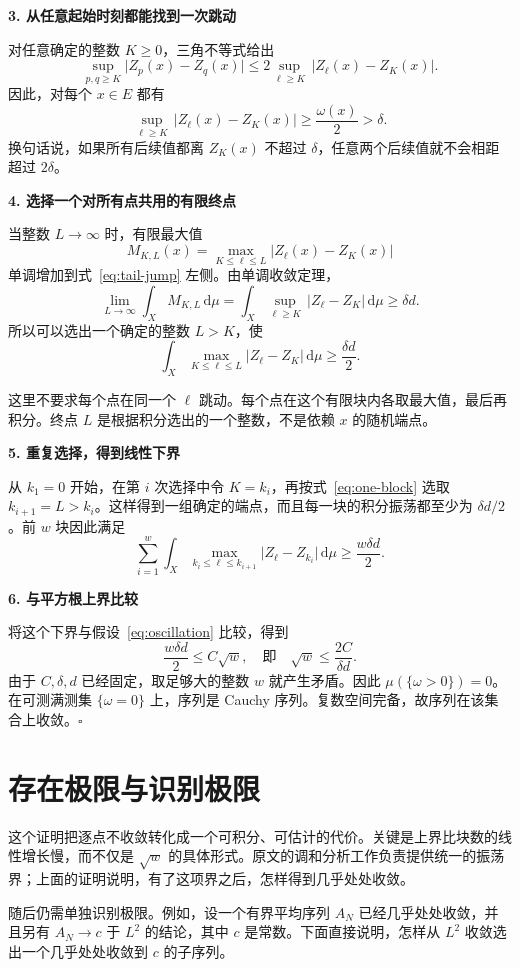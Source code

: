 \documentclass[12pt,a4paper]{article}
\newcommand{\step}[1]{\par\addvspace{0.65em}\Needspace{5\baselineskip}\noindent\textbf{#1}\par\nobreak}
\newcommand{\dd}{\,\mathrm{d}}
\begin{document}
\step{3. 从任意起始时刻都能找到一次跳动}
对任意确定的整数 $K\geq0$，三角不等式给出
\[
\sup_{p,q\geq K}\lvert Z_p(x)-Z_q(x)\rvert
\leq 2\sup_{\ell\geq K}\,\lvert Z_\ell(x)-Z_K(x)\rvert.
\]
因此，对每个 $x\in E$ 都有
\begin{equation}\label{eq:tail-jump}
\sup_{\ell\geq K}\,\lvert Z_\ell(x)-Z_K(x)\rvert
\geq\frac{\omega(x)}2>\delta.
\end{equation}
换句话说，如果所有后续值都离 $Z_K(x)$ 不超过 $\delta$，任意两个后续值就不会相距超过 $2\delta$。

\step{4. 选择一个对所有点共用的有限终点}
当整数 $L\to\infty$ 时，有限最大值
\[
M_{K,L}(x)=\max_{K\leq\ell\leq L}\lvert Z_\ell(x)-Z_K(x)\rvert
\]
单调增加到式~\eqref{eq:tail-jump} 左侧。由单调收敛定理，
\[
\lim_{L\to\infty}\int_X M_{K,L}\dd\mu
=\int_X\sup_{\ell\geq K}\,\lvert Z_\ell-Z_K\rvert\dd\mu
\geq\delta d.
\]
所以可以选出一个确定的整数 $L>K$，使
\begin{equation}\label{eq:one-block}
\int_X\max_{K\leq\ell\leq L}\lvert Z_\ell-Z_K\rvert\dd\mu
\geq\frac{\delta d}{2}.
\end{equation}

这里不要求每个点在同一个 $\ell$ 跳动。每个点在这个有限块内各取最大值，最后再积分。终点 $L$ 是根据积分选出的一个整数，不是依赖 $x$ 的随机端点。

\step{5. 重复选择，得到线性下界}
从 $k_1=0$ 开始，在第 $i$ 次选择中令 $K=k_i$，再按式~\eqref{eq:one-block} 选取 $k_{i+1}=L>k_i$。这样得到一组确定的端点，而且每一块的积分振荡都至少为 $\delta d/2$。前 $w$ 块因此满足
\[
\sum_{i=1}^{w}\int_X
\max_{k_i\leq\ell\leq k_{i+1}}
\lvert Z_\ell-Z_{k_i}\rvert\dd\mu
\geq\frac{w\delta d}{2}.
\]

\step{6. 与平方根上界比较}
将这个下界与假设~\eqref{eq:oscillation} 比较，得到
\[
\frac{w\delta d}{2}\leq C\sqrt w,
\quad\text{即}\quad
\sqrt w\leq\frac{2C}{\delta d}.
\]
由于 $C,\delta,d$ 已经固定，取足够大的整数 $w$ 就产生矛盾。因此 $\mu(\{\omega>0\})=0$。在可测满测集 $\{\omega=0\}$ 上，序列是 Cauchy 序列。复数空间完备，故序列在该集合上收敛。\hfill$\square$

\section{存在极限与识别极限}
这个证明把逐点不收敛转化成一个可积分、可估计的代价。关键是上界比块数的线性增长慢，而不仅是 $\sqrt w$ 的具体形式。原文的调和分析工作负责提供统一的振荡界；上面的证明说明，有了这项界之后，怎样得到几乎处处收敛。

随后仍需单独识别极限。例如，设一个有界平均序列 $A_N$ 已经几乎处处收敛，并且另有 $A_N\to c$ 于 $L^2$ 的结论，其中 $c$ 是常数。下面直接说明，怎样从 $L^2$ 收敛选出一个几乎处处收敛到 $c$ 的子序列。
\end{document}
